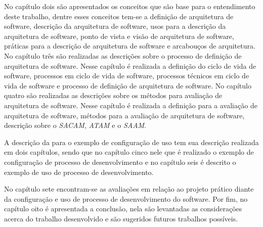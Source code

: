 No capítulo dois são apresentados os conceitos que são base para o entendimento deste trabalho, dentre esses conceitos tem-se a definição de arquitetura de software, descrição da arquitetura de software, usos para a descrição da arquitetura de software, ponto de vista e visão de arquitetura de software, práticas para a descrição de arquitetura de software e arcabouços de arquitetura.
No capítulo três são realizadas as descrições sobre o processo de definição de arquitetura de software. Nesse capítulo é realizada a definição do ciclo de vida de software, processos em ciclo de vida de software, processos técnicos em ciclo de vida de software e processo de definição de arquitetura de software.
No capítulo quatro são realizadas as descrições sobre os métodos para avaliação de arquitetura de software. Nesse capítulo é realizada a definição para a avaliação de arquitetura de software, métodos para a avaliação de arquitetura de software, descrição sobre o \emph{\acrfull{SACAM}}, \emph{\acrfull{ATAM}} e o \emph{\acrfull{SAAM}}. 

A descrição da para o exemplo de configuração de uso tem sua descrição realizada em dois capítulos, sendo que no capítulo cinco nele que é realizado o exemplo de configuração de processo de desenvolvimento e no capítulo seis é descrito o exemplo de uso de processo de desenvolvimento.

No capítulo sete encontram-se as avaliações em relação ao projeto prático diante da configuração e uso de processo de desenvolvimento do software. Por fim, no capítulo oito é apresentada a conclusão, nela são levantadas as considerações acerca do trabalho desenvolvido e são sugeridos futuros trabalhos possíveis.